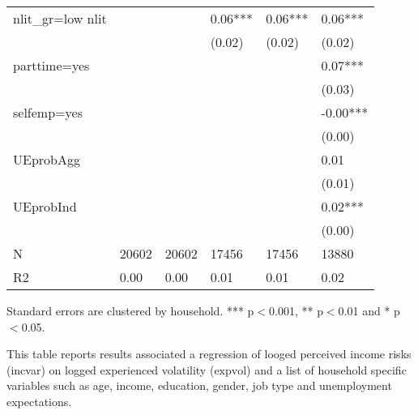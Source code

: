 \begin{table}[p]
\begin{adjustbox}{width=\textwidth}
\begin{threeparttable}
\begin{tabular}{llllll}
nlit\_gr=low nlit &          &           &    0.06*** &     0.06*** &      0.06*** \\
                 &          &           &     (0.02) &      (0.02) &       (0.02) \\
parttime=yes     &          &           &            &             &      0.07*** \\
                 &          &           &            &             &       (0.03) \\
selfemp=yes      &          &           &            &             &     -0.00*** \\
                 &          &           &            &             &       (0.00) \\
UEprobAgg        &          &           &            &             &         0.01 \\
                 &          &           &            &             &       (0.01) \\
UEprobInd        &          &           &            &             &      0.02*** \\
                 &          &           &            &             &       (0.00) \\
N                &    20602 &     20602 &      17456 &       17456 &        13880 \\
R2               &     0.00 &      0.00 &       0.01 &        0.01 &         0.02 \\
\bottomrule
\end{tabular}
\begin{tablenotes}\item Standard errors are clustered by household. *** p$<$0.001, ** p$<$0.01 and * p$<$0.05. 
\item This table reports results associated a regression of looged perceived income risks (incvar) on logged experienced volatility ($\text{expvol}$) and a list of household specific variables such as age, income, education, gender, job type and unemployment expectations.
\end{tablenotes}
\end{threeparttable}
\end{adjustbox}
\end{table}
